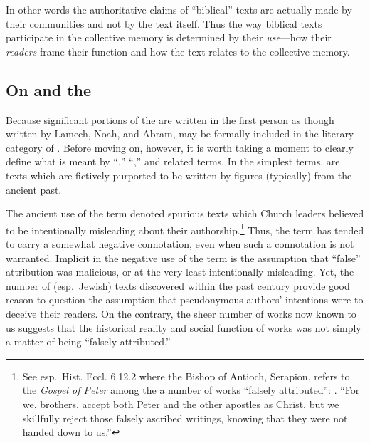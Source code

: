 In other words the authoritative claims of ``biblical'' texts are actually made by their communities and not by the text itself. Thus the way biblical texts participate in the collective memory is determined by their \emph{use}---how their \emph{readers} frame their function and how the text relates to the collective memory. 

\subsection{On \Psy and the \Psa}

Because significant portions of the \ga are written in the first person as though written by Lamech, Noah, and Abram, \ga may be formally included in the literary category of \psy. Before moving on, however, it is worth taking a moment to clearly define what is meant by ``\psy,'' ``\psa,'' and related terms.\autocites[The topic of \psy has received a large amount of very sophisticated attention in recent years. See especially][]{mroczek2016}{tigchelaar_tigchelaar2014}{reed_towsend-moulie2011}{reed_jts2009}{reed_ditomasso-turcescu2008}{najman_hilhorst-puech2007}{najman2003} In the simplest terms, \psa are texts which are fictively purported to be written by figures (typically) from the ancient past. 

The ancient use of the term \psa denoted spurious texts which Church leaders believed to be intentionally misleading about their authorship.\footnote{See esp.~Hist. Eccl. 6.12.2 where the Bishop of Antioch, Serapion, refers to the \emph{Gospel of Peter} among the a number of works ``falsely attributed'': . ``For we, brothers, accept both Peter and the other apostles as Christ, but we skillfully reject those falsely ascribed writings, knowing that they were not handed down to us.''} Thus, the term has tended to carry a somewhat negative connotation, even when such a connotation is not warranted. Implicit in the negative use of the term is the assumption that ``false'' attribution was malicious, or at the very least intentionally misleading. Yet, the number of (esp.~Jewish) \psgraphical texts discovered within the past century provide good reason to question the assumption that pseudonymous authors' intentions were to deceive their readers.\autocites[53--58]{mroczek2016}[See also][]{reed_jts2009} On the contrary, the sheer number of \psgraphical works now known to us suggests that the historical reality and social function of \psgraphical works was not simply a matter of being ``falsely attributed.''

